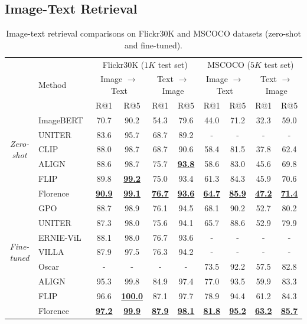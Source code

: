 \documentclass{article}
\begin{document}
\subsection{Image-Text Retrieval}

\begin{table}[t]
\centering
\setlength{\tabcolsep}{9.5pt}
\small
\renewcommand{\arraystretch}{1.35}
\begin{tabular}{cl|cccc|cccc}
\toprule
& & \multicolumn{4}{c|}{Flickr30K ($1K$ test set)} & \multicolumn{4}{c}{MSCOCO ($5K$ test set)} \\
& Method & \multicolumn{2}{c}{Image $\to$ Text} & \multicolumn{2}{c|}{Text $\to$ Image} &
\multicolumn{2}{c}{Image $\to$ Text} & \multicolumn{2}{c}{Text $\to$ Image} \\
& & R@1 & R@5  & R@1 & R@5  & R@1 & R@5  & R@1 & R@5 \\
\midrule
\multirow{5}{*}{\it{Zero-shot}} & ImageBERT~\cite{qi:imagebert} & 70.7 & 90.2 & 54.3 & 79.6 & 44.0 &
71.2 & 32.3 & 59.0  \\
& UNITER~\cite{chen:uniter} & 83.6 & 95.7 & 68.7 & 89.2 & - & - & - & - \\
& CLIP~\cite{radford2021learning} & 88.0 & 98.7 & 68.7 & 90.6 & 58.4 & 81.5 & 37.8 & 62.4 \\
& ALIGN~\cite{jia2021scaling} & 88.6 & 98.7  & 75.7 & \underline{\bf{93.8}}  & 58.6 & 83.0  & 45.6 &
69.8  \\
& FLIP~\cite{yao2021filip} & 89.8 & \underline{\bf{99.2}}  & 75.0 & 93.4  & 61.3 & 84.3  & 45.9 &
70.6  \\
& Florence & \underline{\bf{90.9}} & \underline{\bf{99.1}} &  \underline{\bf{76.7}} &
\underline{\bf{93.6}} & \underline{\bf{64.7}} & \underline{\bf{85.9}} & \underline{\bf{47.2}} &
\underline{\bf{71.4}} \\
\hline
\multirow{7}{*}{\it{Fine-tuned}} & GPO~\cite{chen:vsepooling} & 88.7 & 98.9  & 76.1 & 94.5& 68.1 &
90.2 & 52.7 & 80.2  \\
& UNITER~\cite{chen:uniter} & 87.3 & 98.0 & 75.6 & 94.1 & 65.7 & 88.6 &  52.9 & 79.9  \\
& ERNIE-ViL~\cite{yu:ernie-vil} & 88.1 & 98.0 & 76.7 & 93.6   & - & - & - & - \\
& VILLA~\cite{gan:villa} & 87.9 & 97.5 & 76.3 & 94.2 & - & - & - & - \\
& Oscar~\cite{li:oscar} & - & - & - & - & 73.5 & 92.2 & 57.5 & 82.8 \\
& ALIGN~\cite{jia2021scaling} & {95.3} & {99.8} & {84.9} & {97.4} & {77.0} & {93.5} & {59.9} &
{83.3} \\
& FLIP~\cite{yao2021filip} & 96.6 & \underline{\bf{100.0}}  & 87.1 & 97.7  & 78.9 & 94.4  & 61.2 &
84.3  \\
& Florence & \underline{\bf{97.2}} & \underline{\bf{99.9}} & \underline{\bf{87.9}} &
\underline{\bf{98.1}} & \underline{\bf{81.8}} & \underline{\bf{95.2}}& \underline{\bf{63.2}} &
\underline{\bf{85.7}} \\
\bottomrule
\end{tabular}
\caption{Image-text retrieval comparisons on Flickr30K and MSCOCO datasets (zero-shot and
fine-tuned).}
\label{tab:flickr30k_mscoco_result}
\end{table}
\end{document}
